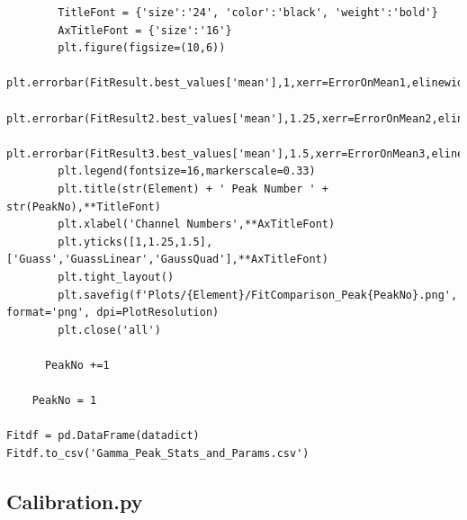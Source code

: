 \documentclass[11pt,a4paper]{article}
\begin{document}
\begin{verbatim}
        TitleFont = {'size':'24', 'color':'black', 'weight':'bold'} 
        AxTitleFont = {'size':'16'}
        plt.figure(figsize=(10,6))
        plt.errorbar(FitResult.best_values['mean'],1,xerr=ErrorOnMean1,elinewidth=6,capsize=10,capthick=5,marker='o',markersize=20,label="Gauss")
        plt.errorbar(FitResult2.best_values['mean'],1.25,xerr=ErrorOnMean2,elinewidth=6,capsize=10,capthick=5,marker='o',markersize=20,label="GaussLinear")
        plt.errorbar(FitResult3.best_values['mean'],1.5,xerr=ErrorOnMean3,elinewidth=6,capsize=10,capthick=5,marker='o',markersize=20,label="GaussQuad")
        plt.legend(fontsize=16,markerscale=0.33)
        plt.title(str(Element) + ' Peak Number ' + str(PeakNo),**TitleFont)
        plt.xlabel('Channel Numbers',**AxTitleFont)
        plt.yticks([1,1.25,1.5],['Guass','GuassLinear','GaussQuad'],**AxTitleFont)
        plt.tight_layout()
        plt.savefig(f'Plots/{Element}/FitComparison_Peak{PeakNo}.png', format='png', dpi=PlotResolution)
        plt.close('all')
      
      PeakNo +=1

    PeakNo = 1

Fitdf = pd.DataFrame(datadict)
Fitdf.to_csv('Gamma_Peak_Stats_and_Params.csv')
\end{verbatim}

\clearpage
\subsection{Calibration.py}
\end{document}
